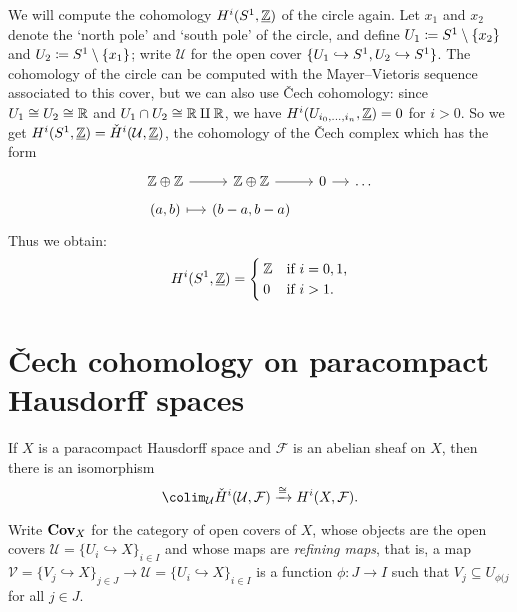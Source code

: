 \begin{exmp}
We will compute the cohomology \(H^i(\sphere[1],\underline{\bb Z})\) of the circle again.
Let \(x_1\) and \(x_2\) denote the `north pole' and `south pole' of the circle, and define \(U_1\coloneq\sphere[1]\setminus\{x_2\}\) and \(U_2\coloneq\sphere[1]\setminus\{x_1\}\); write \(\mathcal U\) for the open cover \(\{U_1\hookrightarrow\sphere[1],U_2\hookrightarrow\sphere[1]\}\).
The cohomology of the circle can be computed with the Mayer--Vietoris sequence associated to this cover, but we can also use Čech cohomology: since \(U_1\cong U_2\cong\mathbb{R}\) and \(U_1\cap U_2\cong\mathbb{R}\amalg\mathbb{R}\), we have \(H^i(U_{i_0,\ldots,i_n},\underline{\mathbb{Z}})=0\) for \(i>0\).
So we get \(H^i(\sphere[1],\underline{\bb Z}) = \check{H}^i(\mathcal U,\underline{\bb Z})\), the cohomology of the Čech complex which has the form
\begin{equation*}
  \begin{tikzcd}[row sep=tiny, column sep=small]
    \bb Z\oplus\bb Z \ar[r] & \bb Z\oplus\bb Z \ar[r] & 0 \ar[r] & \ldots \\
    {(a,b)} \ar[r, mapsto] & {(b-a,b-a)}
  \end{tikzcd}
\end{equation*}
Thus we obtain:
\[ H^i(\sphere[1],\underline{\bb Z}) =
  \begin{cases}
    \bb Z & \text{if } i = 0,1\text{,} \\
    0 & \text{if } i > 1\text{.}
  \end{cases}
\]
\end{exmp}

\section{Čech cohomology on paracompact Hausdorff spaces}

\begin{thm}\label{thm:Čech-cohomology-paracompact-Hausdorff-space}
If \(X\) is a paracompact Hausdorff space and \(\mathcal F\) is an abelian sheaf on \(X\), then there is an isomorphism
\[ \colim_{\mathcal U}\check{H}^i(\mathcal U,\mathcal F) \xrightarrow{\cong} H^i(X,\mathcal F)\text{.} \]
\end{thm}

\begin{defn}
Write \(\mathbf{Cov}_{X}\) for the category of open covers of \(X\), whose objects are the open covers \(\mathcal U=\{U_i\hookrightarrow X\}_{i\in I}\) and whose maps are \emph{refining maps}, that is, a map \(\mathcal V=\{V_j\hookrightarrow X\}_{j\in J}\to\mathcal U=\{U_i\hookrightarrow X\}_{i\in I}\) is a function \(\phi\colon J\to I\) such that \(V_j\subseteq U_{\phi(j}\) for all \(j\in J\).
\end{defn}

